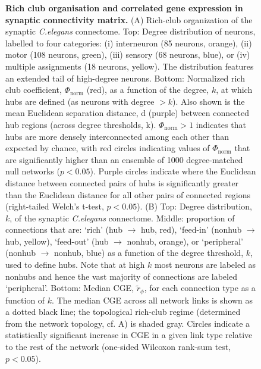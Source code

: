 \begin{figure}[h!]
 \caption{{\bf Rich club organisation and correlated gene expression in synaptic connectivity matrix.}
(A) Rich-club organization of the synaptic \textit{C.elegans} connectome.
Top: Degree distribution of neurons, labelled to four categories: (i) interneuron (85 neurons, orange), (ii) motor (108 neurons, green), (iii) sensory (68 neurons, blue), or (iv) multiple assignments (18 neurons, yellow).
The distribution features an extended tail of high-degree neurons. Bottom: Normalized rich club coefficient, $\Phi_\mathrm{norm}$ (red), as a function of the degree, $k$, at which hubs are defined (as neurons with degree $>k$).
Also shown is the mean Euclidean separation distance, d (purple) between connected hub regions (across degree thresholds, k). $\Phi_\mathrm{norm} > 1$ indicates that hubs are more densely interconnected among each other than expected by chance, with red circles indicating values of $\Phi_\mathrm{norm}$ that are significantly higher than an ensemble of 1000 degree-matched null networks ($p < 0.05$).
Purple circles indicate where the Euclidean distance between connected pairs of hubs is significantly greater than the Euclidean distance for all other pairs of connected regions (right-tailed Welch's t-test, $p < 0.05$).
(B) Top: Degree distribution, $k$, of the synaptic \textit{C.elegans}  connectome.
Middle: proportion of connections that are: `rich' (hub $\rightarrow$ hub, red), `feed-in' (nonhub $\rightarrow$ hub, yellow), `feed-out' (hub $\rightarrow$ nonhub, orange), or `peripheral' (nonhub $\rightarrow$ nonhub, blue) as a function of the degree threshold, $k$, used to define hubs.
Note that at high $k$ most neurons are labeled as nonhubs and hence the vast majority of connections are labeled `peripheral'.
Bottom: Median CGE, $\tilde{r}_\phi$, for each connection type as a function of $k$.
The median CGE across all network links is shown as a dotted black line; the topological rich-club regime (determined from the network topology, cf. A) is shaded gray.
Circles indicate a statistically significant increase in CGE in a given link type relative to the rest of the network (one-sided Wilcoxon rank-sum test, $p < 0.05$).}

\label{fig:Ch2S1_Fig}
\end{figure}

